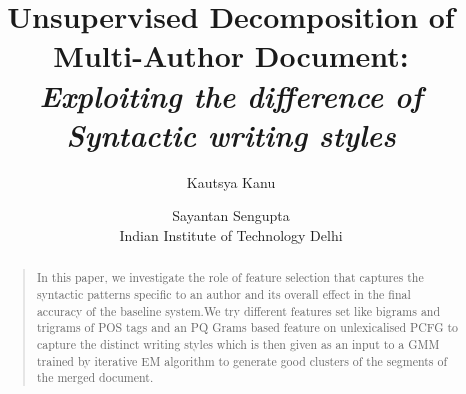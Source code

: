 \documentclass[letterpaper]{article}
\begin{document}
%
\title{Unsupervised Decomposition of Multi-Author Document:\\\textit{Exploiting the difference of Syntactic writing styles}}
\author{Kautsya Kanu \and   Sayantan Sengupta\\ 
Indian Institute of Technology Delhi\\
}
\maketitle

 \begin{abstract}
 \begin{quote}
In this paper, we investigate the role of feature  selection  that captures the syntactic patterns specific to an author and its overall effect in the final accuracy of the baseline system.We try different features set like bigrams and trigrams of POS tags and an PQ Grams based feature on unlexicalised PCFG to capture the distinct writing styles which is then given as an input to a GMM trained by  iterative EM algorithm to generate good clusters of the segments of the merged document.
 \end{quote}
 \end{abstract}
\end{document}
